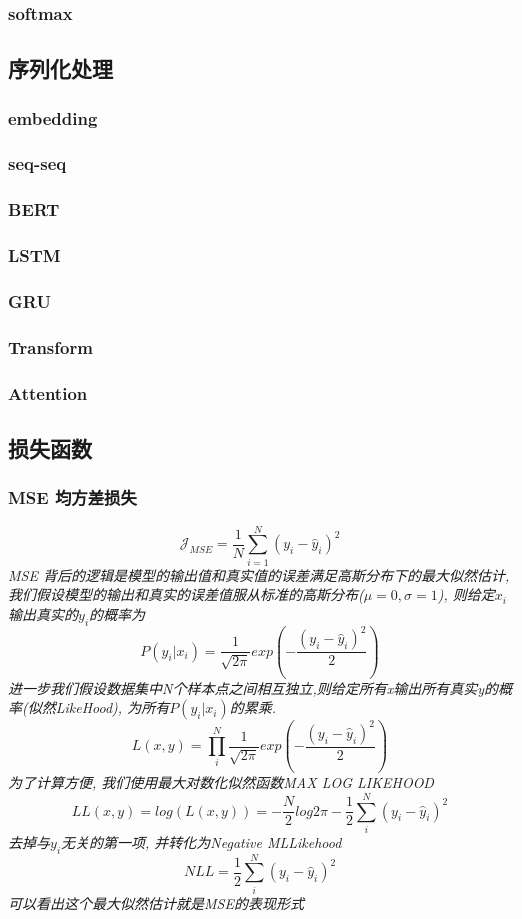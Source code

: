 \documentclass{scrartcl}
\numberwithin{equation}{section}
\begin{document}
\subsubsection{softmax}

\subsection{序列化处理}
\subsubsection{embedding}
\subsubsection{seq-seq}
\subsubsection{BERT}
\subsubsection{LSTM}
\subsubsection{GRU}
\subsubsection{Transform}
\subsubsection{Attention}
\subsection{损失函数}
\subsubsection{MSE 均方差损失}
\textsl{
    $$\mathcal{J}_{MSE} = \frac{1}{N}\sum_{i=1}^N{(y_i - \hat{y}_i)^2} $$
MSE 背后的逻辑是模型的输出值和真实值的误差满足高斯分布下的最大似然估计, 我们假设模型的输出和真实的误差值服从标准的高斯分布($\mu=0, \sigma=1$), 则给定$x_i$输出真实的$y_i$的概率为$$P(y_i\vert x_i) = \frac{1}{\sqrt{2 \pi}}exp(- \frac{(y_i -  \hat{y}_i)^2}{2})$$进一步我们假设数据集中N个样本点之间相互独立,则给定所有x输出所有真实y的概率(似然LikeHood), 为所有$P(y_i\vert x_i)$的累乘. $$L(x,y) = \prod_i^N  \frac{1}{\sqrt{2 \pi}}exp(- \frac{(y_i -  \hat{y}_i)^2}{2})$$为了计算方便, 我们使用最大对数化似然函数MAX LOG LIKEHOOD$$LL(x,y) =  log(L(x,y)) = -\frac{N}{2}log{2\pi} -\frac{1}{2} \sum_i^N(y_i -\hat{y}_i)^2$$去掉与$y_i$无关的第一项, 并转化为Negative MLLikehood $$NLL= \frac{1}{2} \sum_i^N(y_i -\hat{y}_i)^2$$可以看出这个最大似然估计就是MSE的表现形式
}
\end{document}
